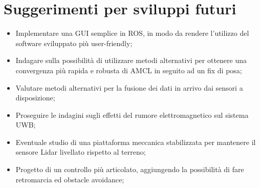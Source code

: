 
\chapter{Suggerimenti per sviluppi futuri}
\label{capitolo5}

\begin{itemize}
    \item Implementare una GUI semplice in ROS, in modo da rendere l'utilizzo del software sviluppato più user-friendly;
    \item Indagare sulla possibilità di utilizzare metodi alternativi per ottenere una convergenza più rapida e robusta di AMCL in seguito ad un fix di posa;
    \item Valutare metodi alternativi per la fusione dei dati in arrivo dai sensori a disposizione;
    \item Proseguire le indagini sugli effetti del rumore elettromagnetico sul sistema UWB;
    \item Eventuale studio di una piattaforma meccanica stabilizzata per mantenere il sensore Lidar livellato rispetto al terreno;
    \item Progetto di un controllo più articolato, aggiungendo la possibilità di fare retromarcia ed obstacle avoidance;
\end{itemize}

